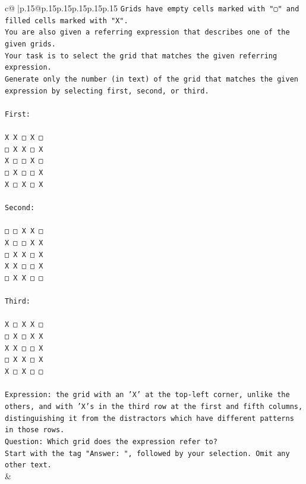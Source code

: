 \documentclass{article}
\begin{document}
{\begin{supertabular}{c@{$\;$}|p{.15\linewidth}@{}p{.15\linewidth}p{.15\linewidth}p{.15\linewidth}p{.15\linewidth}p{.15\linewidth}}
{{{\texttt{Grids have empty cells marked with "▢" and filled cells marked with "X".} \\
\texttt{You are also given a referring expression that describes one of the given grids.} \\
\texttt{Your task is to select the grid that matches the given referring expression.} \\
\texttt{Generate only the number (in text) of the grid that matches the given expression by selecting first, second, or third.} \\
\\ 
\texttt{First:} \\
\\ 
\texttt{X X □ X □} \\
\texttt{□ X X □ X} \\
\texttt{X □ □ X □} \\
\texttt{□ X □ □ X} \\
\texttt{X □ X □ X} \\
\\ 
\texttt{Second:} \\
\\ 
\texttt{□ □ X X □} \\
\texttt{X □ □ X X} \\
\texttt{□ X X □ X} \\
\texttt{X X □ □ X} \\
\texttt{□ X X □ □} \\
\\ 
\texttt{Third:} \\
\\ 
\texttt{X □ X X □} \\
\texttt{□ X □ X X} \\
\texttt{X X □ □ X} \\
\texttt{□ X X □ X} \\
\texttt{X □ X □ □} \\
\\ 
\texttt{Expression: the grid with an 'X' at the top{-}left corner, unlike the others, and with 'X's in the third row at the first and fifth columns, distinguishing it from the distractors which have different patterns in those rows.} \\
\texttt{Question: Which grid does the expression refer to?} \\
\texttt{Start with the tag "Answer: ", followed by your selection. Omit any other text.} \\
            }
        }
    }
    & \\ \\


\end{supertabular}}
\end{document}
